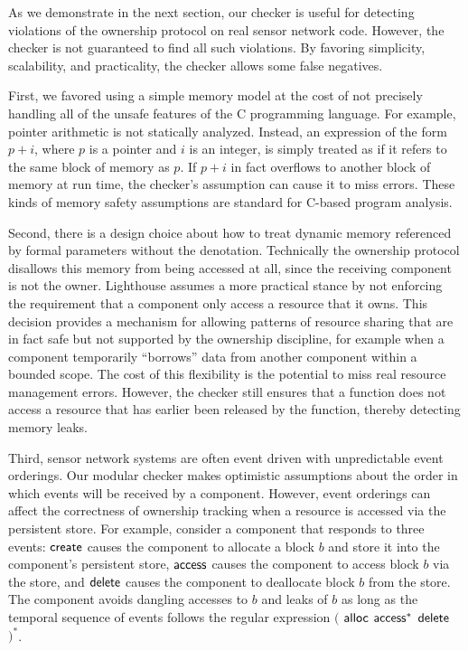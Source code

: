 As we demonstrate in the next section, our checker is useful for detecting
violations of the ownership protocol on real sensor network code.  
%
However, the checker is not guaranteed to find all such violations.  
%
By favoring simplicity, scalability, and practicality, the checker allows some
false negatives.




First, we favored using a simple memory model at the cost of not precisely
handling all of the unsafe features of the C programming language.  
%
For example, pointer arithmetic is not statically analyzed.  
%
Instead, an expression of the form $p+i$, where $p$ is a pointer and $i$ is an
integer, is simply treated as if it refers to the same block of memory as $p$.  
%
If $p+i$ in fact overflows to another block of memory at run time, the
checker's assumption can cause it to miss errors.  
%
These kinds of memory safety assumptions are standard for C-based program
analysis.



Second, there is a design choice about how to treat dynamic memory referenced
by formal parameters without the  denotation.
%
Technically the ownership protocol disallows this memory from being accessed
at all, since the receiving component is not the owner.  
%
Lighthouse assumes a more practical stance by not enforcing the requirement
that a component only access a resource that it owns.
% 
This decision provides a mechanism for allowing patterns of resource sharing
that are in fact safe but not supported by the ownership discipline, for
example when a component temporarily ``borrows'' data from another component
within a bounded scope.
%
The cost of this flexibility is the potential to miss real resource management
errors.
%
However, the checker still ensures that a function does not access a resource
that has earlier been released by the function, thereby detecting memory
leaks.



Third, sensor network systems are often event driven with unpredictable event
orderings.
%
Our modular checker makes optimistic assumptions about the order in which
events will be received by a component.  
%
However, event orderings can affect the correctness of ownership tracking when
a resource is accessed via the persistent store.
%
For example, consider a component that responds to three events: ${\mathsf{create}}$
causes the component to allocate a block $b$ and store it into the component's
persistent store, ${\mathsf{access}}$ causes the component to access block $b$ via the
store, and ${\mathsf{delete}}$ causes the component to deallocate block $b$ from the
store.  
%
The component avoids dangling accesses to $b$ and leaks of $b$ as long as the
temporal sequence of events follows the regular expression $($ ${\mathsf{alloc}}$
${\mathsf{access}}^*$ ${\mathsf{delete}}$ $)^*$.  



